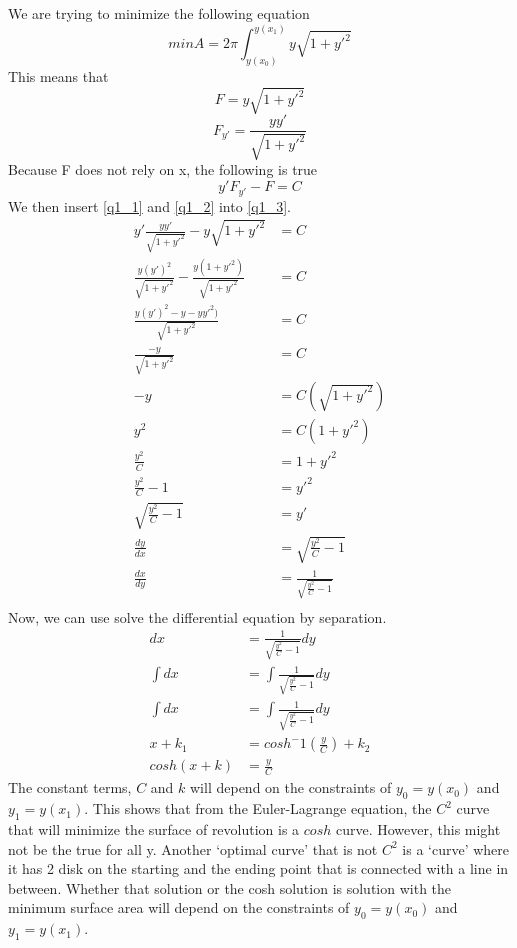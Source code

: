 We are trying to minimize the following equation
\begin{equation}
min A =  2 \pi \int_{y(x_0)}^{y(x_1)} y \sqrt{1 + y'^2}
\end{equation}
This means that
\begin{equation}\label{q1_1}
F =  y \sqrt{1 + y'^2}
\end{equation}
\begin{equation}\label{q1_2}
F_{y'} = \frac{yy'}{\sqrt{1 + y'^2}}
\end{equation}
Because F does not rely on x, the following is true
\begin{equation}\label{q1_3}
y'F_{y'} - F = C
\end{equation}
We then insert \ref{q1_1} and \ref{q1_2} into \ref{q1_3}.
\begin{equation}
\begin{aligned}
y'\frac{yy'}{\sqrt{1 + y'^2}} - y \sqrt{1 + y'^2} &= C\\
\frac{y(y')^2}{\sqrt{1 + y'^2}} - \frac{y(1 + y'^2)}{\sqrt{1 + y'^2}} &= C\\
\frac{y(y')^2 - y - yy'^2)}{\sqrt{1 + y'^2}} &= C\\
\frac{-y}{\sqrt{1 + y'^2}} &= C\\
-y &= C (\sqrt{1 + y'^2}) \\
y^2 &= C (1 + y'^2)\\
\frac{y^2}{C} &= 1 + y'^2\\
\frac{y^2}{C} - 1 &= y'^2\\
\sqrt{\frac{y^2}{C} - 1} &= y'\\
\frac{dy}{dx} &= \sqrt{\frac{y^2}{C} - 1}\\
\frac{dx}{dy} &= \frac{1}{\sqrt{\frac{y^2}{C} - 1}}\\
\end{aligned}
\end{equation}
Now, we can use solve the differential equation by separation.
\begin{equation}
\begin{aligned}
dx &= \frac{1}{\sqrt{\frac{y^2}{C} - 1}} dy\\
\int dx &= \int \frac{1}{\sqrt{\frac{y^2}{C} - 1}} dy\\
\int dx &= \int \frac{1}{\sqrt{\frac{y^2}{C} - 1}} dy\\
x + k_1 &= cosh^-1(\frac{y}{C}) + k_2\\
cosh(x + k) &= \frac{y}{C}
\end{aligned}
\end{equation}
The constant terms, $C$ and $k$ will depend on the constraints of $y_0 = y(x_0)$ and $y_1 = y(x_1)$. This shows that from the Euler-Lagrange equation, the $C^2$ curve that will minimize the surface of revolution is a $cosh$ curve. However, this might not be the true for all y. Another `optimal curve' that is not $C^2$ is a `curve' where it has 2 disk on the starting and the ending point that is connected with a line in between. Whether that solution or the cosh solution is solution with the minimum surface area will depend on the constraints of $y_0 = y(x_0)$ and $y_1 = y(x_1)$.

